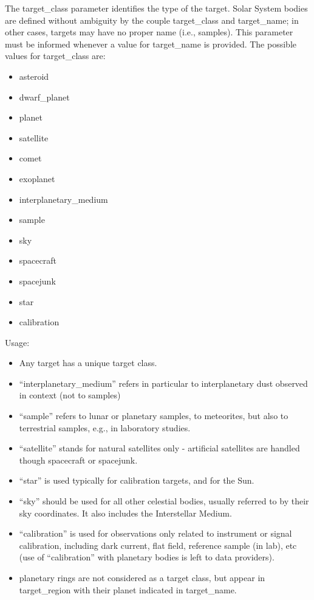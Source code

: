 \documentclass[11pt,a4paper]{ivoa}
\begin{document}
The target\_class parameter identifies the type of the target. Solar System bodies are defined without ambiguity by the couple target\_class and target\_name; in other cases, targets may have no proper name (i.e., samples). This parameter must be informed whenever a value for target\_name is provided. The possible values for target\_class are:

\begin{itemize}
\item asteroid
\item dwarf\_planet
\item planet
\item satellite
\item comet
\item exoplanet
\item interplanetary\_medium
\item sample
\item sky
\item spacecraft
\item spacejunk
\item star
\item calibration
\end{itemize}

Usage:

\begin{itemize}
\item Any target has a unique target class.
\item ``interplanetary\_medium'' refers in particular to interplanetary dust observed in context (not to samples)
\item ``sample'' refers to lunar or planetary samples, to meteorites, but also to terrestrial samples, e.g., in laboratory studies.
\item ``satellite'' stands for natural satellites only - artificial satellites are handled though spacecraft or spacejunk.
\item ``star'' is used typically for calibration targets, and for the Sun.
\item ``sky'' should be used for all other celestial bodies, usually referred to by their sky coordinates. It also includes the Interstellar Medium.
\item ``calibration'' is used for observations only related to instrument or signal calibration, including dark current, flat field, reference sample (in lab), etc (use of ``calibration'' with planetary bodies is left to data providers).
\item planetary rings are not considered as a target class, but appear in target\_region with their planet indicated in target\_name.
\end{itemize}
\end{document}
